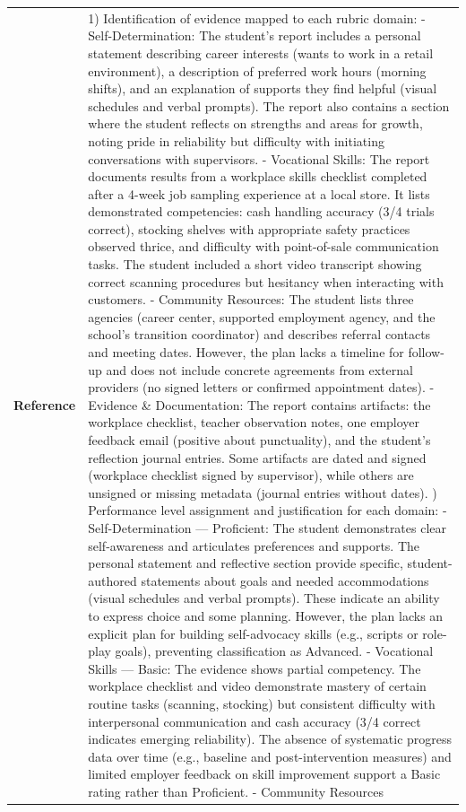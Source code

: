 \begin{longtable}{@{}l p{13cm}@{}}
  \textbf{Reference} & 1) Identification of evidence mapped to each rubric domain: \newline - Self-Determination: The student's report includes a personal statement describing career interests (wants to work in a retail environment), a description of preferred work hours (morning shifts), and an explanation of supports they find helpful (visual schedules and verbal prompts). The report also contains a section where the student reflects on strengths and areas for growth, noting pride in reliability but difficulty with initiating conversations with supervisors. \newline - Vocational Skills: The report documents results from a workplace skills checklist completed after a 4-week job sampling experience at a local store. It lists demonstrated competencies: cash handling accuracy (3/4 trials correct), stocking shelves with appropriate safety practices observed thrice, and difficulty with point-of-sale communication tasks. The student included a short video transcript showing correct scanning procedures but hesitancy when interacting with customers. \newline - Community Resources: The student lists three agencies (career center, supported employment agency, and the school's transition coordinator) and describes referral contacts and meeting dates. However, the plan lacks a timeline for follow-up and does not include concrete agreements from external providers (no signed letters or confirmed appointment dates). \newline - Evidence \& Documentation: The report contains artifacts: the workplace checklist, teacher observation notes, one employer feedback email (positive about punctuality), and the student's reflection journal entries. Some artifacts are dated and signed (workplace checklist signed by supervisor), while others are unsigned or missing metadata (journal entries without dates). \newline 2) Performance level assignment and justification for each domain: \newline - Self-Determination --- Proficient: The student demonstrates clear self-awareness and articulates preferences and supports. The personal statement and reflective section provide specific, student-authored statements about goals and needed accommodations (visual schedules and verbal prompts). These indicate an ability to express choice and some planning. However, the plan lacks an explicit plan for building self-advocacy skills (e.g., scripts or role-play goals), preventing classification as Advanced. \newline - Vocational Skills --- Basic: The evidence shows partial competency. The workplace checklist and video demonstrate mastery of certain routine tasks (scanning, stocking) but consistent difficulty with interpersonal communication and cash accuracy (3/4 correct indicates emerging reliability). The absence of systematic progress data over time (e.g., baseline and post-intervention measures) and limited employer feedback on skill improvement support a Basic rating rather than Proficient. \newline - Community Resources 
\end{longtable}
